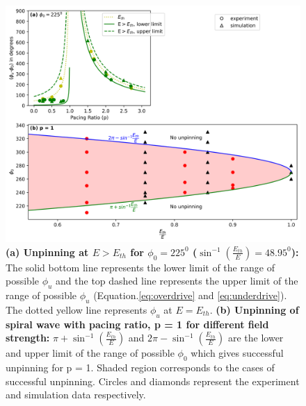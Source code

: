 \documentclass[%
 preprint,
 amsmath,amssymb,
 aps,
]{revtex4-2}
\begin{document}
\begin{figure}[H]
    \centering
    \includegraphics[scale=0.7]{E.png}
    \caption{\textbf{(a) Unpinning at $E>E_{th}$ for ${\phi}_0 = 225^0$ (${\sin^{-1}}{(\frac{E_{th}}{E})}=48.95^0$):} The solid bottom line represents the lower limit of the range of possible ${\phi}_u$ and the top dashed line represents the upper limit of the range of possible ${\phi}_u$ (Equation.\ref{eq:overdrive} and \ref{eq:underdrive}). The dotted yellow line represents ${\phi}_u$ at $E=E_{th}$.
    \textbf{(b) Unpinning of spiral wave with pacing ratio, p = 1 for different field strength:} $\pi+{\sin^{-1}}{(\frac{E_{th}}{E})}$ and $2\pi-{\sin^{-1}}{(\frac{E_{th}}{E})}$ are the lower and upper limit of 
    the range of possible ${\phi}_0$ which gives successful unpinning for p = 1. Shaded region corresponds to the cases of successful unpinning.
    Circles and diamonds represent the experiment and simulation data respectively.}
    \label{fig:E_p1}
\end{figure}
\end{document}

